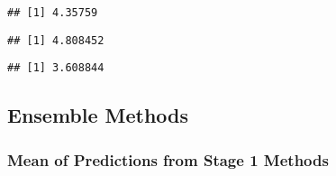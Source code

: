 \documentclass[]{article}
\newenvironment{Shaded}{\begin{snugshade}}{\end{snugshade}}
\newcommand{\DataTypeTok}[1]{\textcolor[rgb]{0.13,0.29,0.53}{#1}}
\newcommand{\DecValTok}[1]{\textcolor[rgb]{0.00,0.00,0.81}{#1}}
\newcommand{\KeywordTok}[1]{\textcolor[rgb]{0.13,0.29,0.53}{\textbf{#1}}}
\newcommand{\NormalTok}[1]{#1}
\newcommand{\OperatorTok}[1]{\textcolor[rgb]{0.81,0.36,0.00}{\textbf{#1}}}
\newcommand{\StringTok}[1]{\textcolor[rgb]{0.31,0.60,0.02}{#1}}
\begin{document}
\begin{verbatim}
## [1] 4.35759
\end{verbatim}

\begin{Shaded}
\end{Shaded}

\begin{verbatim}
## [1] 4.808452
\end{verbatim}

\begin{Shaded}
\end{Shaded}

\begin{verbatim}
## [1] 3.608844
\end{verbatim}

\newpage

\hypertarget{ensemble-methods}{%
\subsection{Ensemble Methods}\label{ensemble-methods}}

\hypertarget{mean-of-predictions-from-stage-1-methods}{%
\subsubsection{Mean of Predictions from Stage 1
Methods}\label{mean-of-predictions-from-stage-1-methods}}
\end{document}
